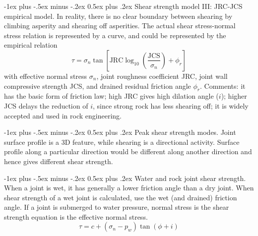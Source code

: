 \documentclass[10pt,landscape,a4paper]{article}
\makeatletter
\renewcommand{\section}{\@startsection{section}{1}{0mm}%
	{-1ex plus -.5ex minus -.2ex}%
	{0.5ex plus .2ex}%
	{\normalfont\large\bfseries}}
\makeatother
\begin{document}
\begin{multicols}{3}
	\section{Shear strength model III: JRC-JCS empirical model.}
	In reality, there is no clear boundary between shearing by climbing asperity and shearing off asperities.
	The actual shear stress-normal stress relation is represented by a curve, and could be represented by the empirical relation
	\[
		\tau=\sigma_n\tan\left[\text{JRC}\log_{10}\left(\frac{\text{JCS}}{\sigma_n}\right)+\phi_r\right]
	\]
	with effective normal stress $\sigma_n$, joint roughness coefficient JRC, joint wall compressive strength JCS, and drained residual friction angle $\phi_r$.
	Comments: it has the basic form of friction law; high JRC gives high dilation angle ($i$); higher JCS delays the reduction of $i$, since strong rock has less shearing off; it is widely accepted and used in rock engineering.
	
	\section{Peak shear strength modes.}
	Joint surface profile is a 3D feature, while shearing is a directional activity.
	Surface profile along a particular direction would be different along another direction and hence gives different shear strength.
	
	\section{Water and rock joint shear strength.}
	When a joint is wet, it has generally a lower friction angle than a dry joint.
	When shear strength of a wet joint is calculated, use the wet (and drained) friction angle.
	If a joint is submerged to water pressure, normal stress is the shear strength equation is the effective normal stress.
	\[
		\tau=c+(\sigma_n-p_w)\tan(\phi+i)
	\]
	

\end{multicols}
\end{document}
